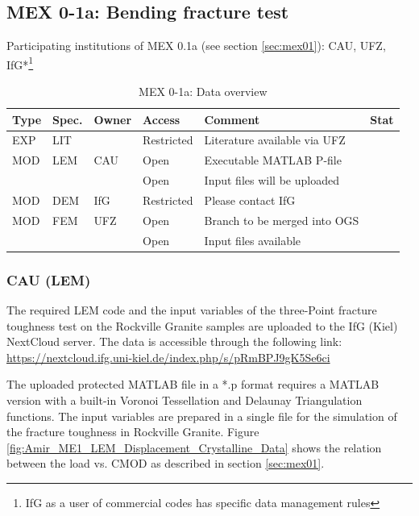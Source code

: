 \subsection{MEX 0-1a: Bending fracture test}

Participating institutions of MEX 0.1a (see section \ref{sec:mex01}): CAU, UFZ, IfG*\footnote{IfG as a user of commercial codes has specific data management rules}

\begin{table}[ht!]
\caption{MEX 0-1a: Data overview}
\label{tab:dms-mex11-overview}
\small
\begin{tabular}{l|l|l|l|L{4.7cm}|l}
\hline
{}
Type & Spec. & Owner                & Access     & Comment & Stat \\ 
\hline
EXP  & LIT   & \cite{Tarokh2016161} & Restricted & Literature available via UFZ  &  \\
\hline \hline
MOD  & LEM   & CAU                  & Open       & Executable MATLAB P-file               &  \\
     &       &                      & Open       & Input files will be uploaded  &  \\
\hline
MOD  & DEM   & IfG                  & Restricted & Please contact IfG            & \\
\hline
MOD  & FEM   & UFZ                  & Open       & Branch to be merged into OGS  &  \\
     &       &                      & Open       & Input files available         &  \\
%
\hline
\end{tabular}
\end{table}
\normalsize

\subsubsection*{CAU (LEM)}

The required LEM code and the input variables of the three-Point fracture toughness test on the Rockville Granite samples are uploaded to the IfG (Kiel) NextCloud server. The data is accessible through the following link:\\
\url{https://nextcloud.ifg.uni-kiel.de/index.php/s/pRmBPJ9gK5Se6ci}

The uploaded protected MATLAB file in a *.p format requires a MATLAB version with a built-in Voronoi Tessellation and Delaunay Triangulation functions. The input variables are prepared in a single file for the simulation of the fracture toughness in Rockville Granite. Figure \ref{fig:Amir_ME1_LEM_Displacement_Crystalline_Data} shows the relation between the load vs. CMOD as described in section \ref {sec:mex01}.

